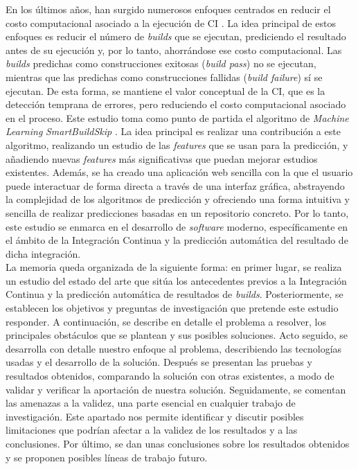 En los últimos años, han surgido numerosos enfoques centrados en reducir el costo computacional
asociado a la ejecución de CI \cite{1,2,4,5,6,7}. La idea principal de estos enfoques es
reducir el número de \textit{builds} que se ejecutan, prediciendo el resultado antes de su
ejecución y, por lo tanto, ahorrándose ese costo computacional. Las \textit{builds} predichas como
construcciones exitosas (\textit{build pass}) no se ejecutan, mientras que las predichas como
construcciones fallidas (\textit{build failure}) sí se ejecutan. De esta forma, se mantiene el
valor conceptual de la CI, que es la detección temprana de errores, pero reduciendo
el costo computacional asociado en el proceso. Este estudio toma como punto de partida el
algoritmo de \textit{Machine Learning} \textit{SmartBuildSkip} \cite{2}. La idea principal es
realizar una contribución a este algoritmo, realizando un estudio de las \textit{features} que
se usan para la predicción, y añadiendo nuevas \textit{features} más significativas que puedan
mejorar estudios existentes. Además, se ha creado una aplicación web sencilla con la que el usuario
puede interactuar de forma directa a través de una interfaz gráfica, abstrayendo la complejidad
de los algoritmos de predicción y ofreciendo una forma intuitiva y sencilla de realizar
predicciones basadas en un repositorio concreto. Por lo tanto, este estudio se enmarca en el
desarrollo de \textit{software} moderno, específicamente en el ámbito de la Integración Continua y
la predicción automática del resultado de dicha integración.\\

La memoria queda organizada de la siguiente forma: en primer lugar, se realiza un estudio del
estado del arte que sitúa los antecedentes previos a la Integración Continua y la predicción
automática de resultados de \textit{builds}. Posteriormente, se establecen los objetivos y
preguntas de investigación que pretende este estudio responder. A continuación, se describe
en detalle el problema a resolver, los principales obstáculos que se plantean y sus posibles
soluciones. Acto seguido, se desarrolla con detalle nuestro enfoque al problema, describiendo
las tecnologías usadas y el desarrollo de la solución. Después se presentan las pruebas y
resultados obtenidos, comparando la solución con otras existentes, a modo de validar y verificar
la aportación de nuestra solución. Seguidamente, se comentan las amenazas a la validez, una
parte esencial en cualquier trabajo de investigación. Este apartado nos permite identificar y
discutir posibles limitaciones que podrían afectar a la validez de los resultados y a las
conclusiones. Por último, se dan unas conclusiones sobre los resultados obtenidos y se
proponen posibles líneas de trabajo futuro.
